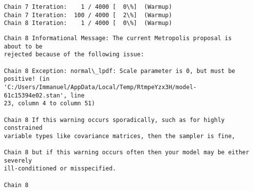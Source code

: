 \documentclass[11pt]{article}
\begin{document}
    \begin{Verbatim}[commandchars=\\\{\}]
Chain 7 Iteration:    1 / 4000 [  0\%]  (Warmup)
Chain 7 Iteration:  100 / 4000 [  2\%]  (Warmup)
Chain 8 Iteration:    1 / 4000 [  0\%]  (Warmup)
    \end{Verbatim}

    \begin{Verbatim}[commandchars=\\\{\}]
Chain 8 Informational Message: The current Metropolis proposal is about to be
rejected because of the following issue:

Chain 8 Exception: normal\_lpdf: Scale parameter is 0, but must be positive! (in
'C:/Users/Immanuel/AppData/Local/Temp/RtmpeYzx3H/model-61c15394e02.stan', line
23, column 4 to column 51)

Chain 8 If this warning occurs sporadically, such as for highly constrained
variable types like covariance matrices, then the sampler is fine,

Chain 8 but if this warning occurs often then your model may be either severely
ill-conditioned or misspecified.

Chain 8

    \end{Verbatim}
\end{document}
